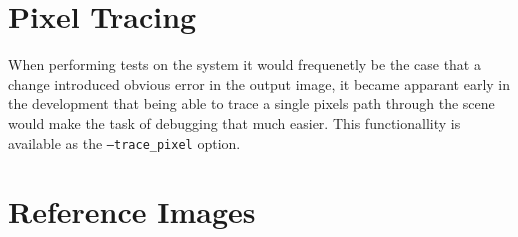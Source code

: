 
\section{Pixel Tracing}
When performing tests on the system it would frequenetly be the case that a change introduced obvious error in the output image,
it became apparant early in the development that being able to trace a single pixels path through the scene would make the
task of debugging that much easier. This functionallity is available as the \texttt{--trace\_pixel} option.

\section{Reference Images}

